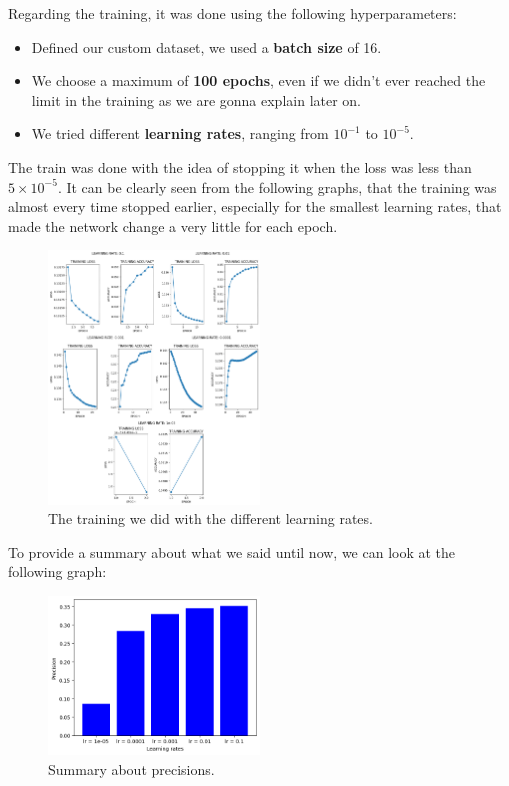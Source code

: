 \documentclass{article}
\begin{document}
Regarding the training, it was done using the following hyperparameters:

\begin{itemize}
    \item Defined our custom dataset, we used a \textbf{batch size} of 16.
    \item We choose a maximum of \textbf{100 epochs}, even if we didn't ever reached the limit in the training as we are gonna explain later on.
    \item We tried different \textbf{learning rates}, ranging from $10^{-1}$ to $10^{-5}$.
\end{itemize}

The train was done with the idea of stopping it when the loss was less than $5 \times 10^{-5}$. It can be clearly seen from the following graphs, that the training was almost every time stopped earlier,
especially for the smallest learning rates, that made the network change a very little for each epoch.

\begin{figure}
    \centering
    \includegraphics[width=0.5\textwidth]{lr_training.png}
    \caption{\label{fig:lr}The training we did with the different learning rates.}
\end{figure}

To provide a summary about what we said until now, we can look at the following graph:

\begin{figure}
    \centering
    \includegraphics[width=0.5\textwidth]{results.png}
    \caption{\label{fig:summary}Summary about precisions.}
\end{figure}
\end{document}
